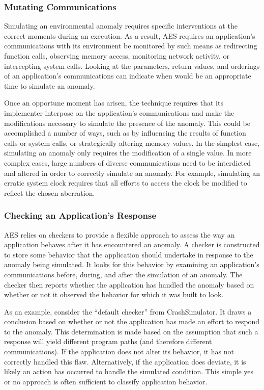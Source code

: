 \subsubsection{Mutating Communications}
\label{SUBSUB:MutatingCommunications}
Simulating an environmental anomaly requires specific interventions at the
correct moments during an execution.
As a result,
AES requires
an application's communications
with its environment
be monitored
by such means as
redirecting function calls,
observing memory access,
monitoring network activity,
or intercepting system calls.
Looking at the parameters,
return values,
and orderings
of an application's communications
can indicate
when would be an appropriate time to simulate an anomaly.

Once an opportune moment has arisen,
the technique requires that its implementer
interpose on the application's communications
and make the modifications necessary
to simulate the presence
of the anomaly.
This could be accomplished
a number of ways,
such as
by influencing the results of function calls or system calls,
or strategically altering memory values.
In the simplest case,
simulating an anomaly only requires
the modification of a single value.
In more complex cases,
large numbers of diverse communications
need to be interdicted and altered
in order to correctly simulate an anomaly.
For example,
simulating an erratic system clock
requires that all efforts
to access the clock
be modified to reflect the chosen aberration.

\subsubsection{Checking an Application's Response}
\label{SUBSUB:CheckingResponse}
AES relies on checkers
to provide a flexible approach to assess the way an application
behaves after it has encountered an anomaly.
A checker is constructed to store
some behavior that the application should undertake
in response to the anomaly being simulated.
It looks for this behavior by examining an application's communications
before, during, and after the simulation of an anomaly.
The checker then reports whether the application has handled
the anomaly based on whether or not it observed the behavior for which it
was built to look.

As an example, consider the ``default checker'' from CrashSimulator.
It draws a conclusion based on
whether or not the application
has made an effort to respond
to the anomaly.
This determination is made based
on the assumption
that such a response will yield
different program paths (and therefore different communications).
If the application
does not alter its behavior, it has not
correctly handled this flaw.
Alternatively,
if the application does deviate,
it is likely
an action has occurred to handle the simulated condition.
This simple yes or no approach
is often sufficient
to classify application behavior.



